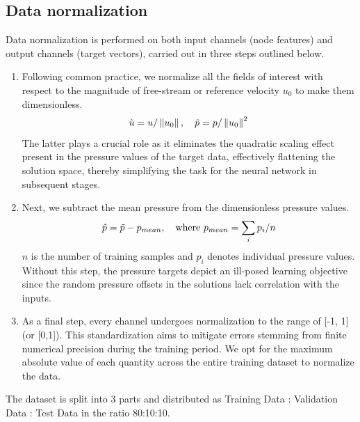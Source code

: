 \subsection{Data normalization}
Data normalization is performed on both input channels (node features) and output channels (target vectors), carried out in three steps outlined below.
\begin{enumerate}
\item Following common practice, we normalize all the fields of interest with respect to the magnitude of free-stream or reference velocity $u_0$ to make them dimensionless. 
\begin{equation}
    \Tilde{u}=u /\left\|u_0\right\|, \quad \Tilde{p}=p /\left\|u_0\right\|^2
\end{equation}
The latter plays a crucial role as it eliminates the quadratic scaling effect present in the pressure values of the target data, effectively flattening the solution space, thereby simplifying the task for the neural network in subsequent stages.
\item Next, we subtract the mean pressure from the dimensionless pressure values. 
\begin{equation}
\hat{p} = \Tilde{p} - p_{mean} , \quad \text{where } p_{mean} = \sum_i p_i / n
\end{equation}
$n$ is the number of training samples and $p_i$ denotes individual pressure values. Without this step, the pressure targets depict an ill-posed learning objective since the random pressure offsets in the solutions lack correlation with the inputs.
\item As a final step, every channel undergoes normalization to the range of [-1, 1] (or [0,1]). This standardization aims to mitigate errors stemming from finite numerical precision during the training period. We opt for the maximum absolute value of each quantity across the entire training dataset to normalize the data. 
\end{enumerate}
The dataset is split into 3 parts and distributed as Training Data : Validation Data : Test Data in the ratio 80:10:10. 
